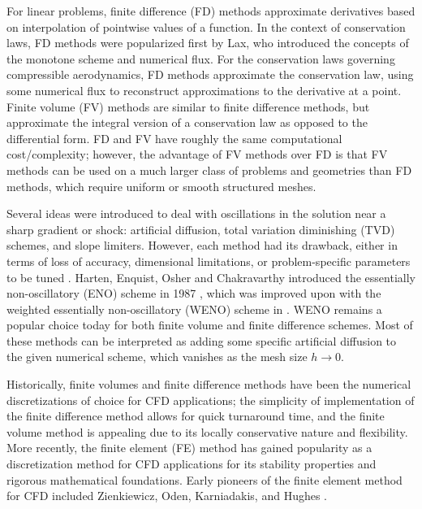 For linear problems, finite difference (FD) methods approximate derivatives based on interpolation of pointwise values of a function.  In the context of conservation laws, FD methods were popularized first by Lax, who introduced the concepts of the monotone scheme and numerical flux. For the conservation laws governing compressible aerodynamics, FD methods approximate the conservation law, using some numerical flux to reconstruct approximations to the derivative at a point. Finite volume (FV) methods are similar to finite difference methods, but approximate the integral version of a conservation law as opposed to the differential form. FD and FV have roughly the same computational cost/complexity; however, the advantage of FV methods over FD is that FV methods can be used on a much larger class of problems and geometries than FD methods, which require uniform or smooth structured meshes. 

Several ideas were introduced to deal with oscillations in the solution near a sharp gradient or shock: artificial diffusion, total variation diminishing (TVD) schemes, and slope limiters. However, each method had its drawback, either in terms of loss of accuracy, dimensional limitations, or problem-specific parameters to be tuned \cite{Shu:Lectures}. Harten, Enquist, Osher and Chakravarthy introduced the essentially non-oscillatory (ENO) scheme in 1987 \cite{ENO}, which was improved upon with the weighted essentially non-oscillatory (WENO) scheme in \cite{WENO}. WENO remains a popular choice today for both finite volume and finite difference schemes.  Most of these methods can be interpreted as adding some specific artificial diffusion to the given numerical scheme, which vanishes as the mesh size $h\rightarrow 0$.  %

Historically, finite volumes and finite difference methods have been the numerical discretizations of choice for CFD applications; the simplicity of implementation of the finite difference method allows for quick turnaround time, and the finite volume method is appealing due to its locally conservative nature and flexibility. More recently, the finite element (FE) method has gained popularity as a discretization method for CFD applications for its stability properties and rigorous mathematical foundations. Early pioneers of the finite element method for CFD included Zienkiewicz, Oden, Karniadakis, and Hughes \cite{ChungCFDBook}.  

